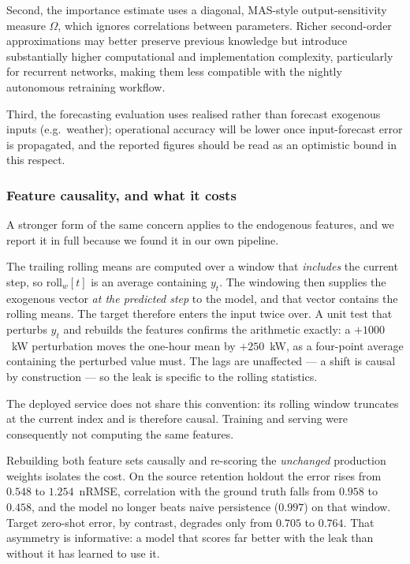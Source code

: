 \documentclass[journal]{IEEEtran}
\begin{document}
Second, the importance estimate uses a diagonal, MAS-style
output-sensitivity measure $\Omega$, which ignores correlations between
parameters. Richer second-order approximations may better preserve
previous knowledge but introduce substantially higher computational and
implementation complexity, particularly for recurrent networks, making
them less compatible with the nightly autonomous retraining workflow.

Third, the forecasting evaluation uses realised rather than forecast
exogenous inputs (e.g.\ weather); operational accuracy will be lower once
input-forecast error is propagated, and the reported figures should be
read as an optimistic bound in this respect.

\subsubsection{Feature causality, and what it costs}
\label{sec:limitations_causal}
A stronger form of the same concern applies to the endogenous features,
and we report it in full because we found it in our own pipeline.

The trailing rolling means are computed over a window that \emph{includes}
the current step, so $\mathrm{roll}_w[t]$ is an average containing $y_t$.
The windowing then supplies the exogenous vector \emph{at the predicted
step} to the model, and that vector contains the rolling means. The target
therefore enters the input twice over. A unit test that perturbs $y_t$ and
rebuilds the features confirms the arithmetic exactly: a $+1000$~kW
perturbation moves the one-hour mean by $+250$~kW, as a four-point average
containing the perturbed value must. The lags are unaffected --- a shift is
causal by construction --- so the leak is specific to the rolling
statistics.

The deployed service does not share this convention: its rolling window
truncates at the current index and is therefore causal. Training and
serving were consequently not computing the same features.

Rebuilding both feature sets causally and re-scoring the \emph{unchanged}
production weights isolates the cost. On the source retention holdout the
error rises from $0.548$ to $1.254$~nRMSE, correlation with the ground
truth falls from $0.958$ to $0.458$, and the model no longer beats naive
persistence ($0.997$) on that window. Target zero-shot error, by contrast,
degrades only from $0.705$ to $0.764$. That asymmetry is informative: a
model that scores far better with the leak than without it has learned to
use it.
\end{document}
